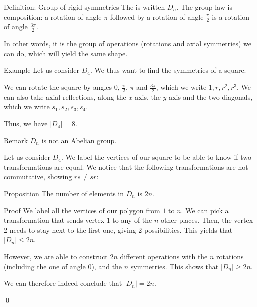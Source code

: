 \documentclass[a4paper]{article}
\begin{document}
\begin{parag}{Definition: Group of rigid symmetries}
    The  is written $D_n$. The group law is composition: a rotation of angle $\pi$ followed by a rotation of angle $\frac{\pi}{2}$ is a rotation of angle $\frac{3\pi}{2}$.

    In other words, it is the group of operations (rotations and axial symmetries) we can do, which will yield the same shape.
\end{parag}

\begin{parag}{Example}
    Let us consider $D_4$. We thus want to find the symmetries of a square.

    We can rotate the square by angles $0$, $\frac{\pi}{2}$, $\pi$ and $\frac{3\pi}{2}$, which we write $1, r, r^2, r^3$. We can also take axial reflections, along the $x$-axis, the $y$-axis and the two diagonals, which we write $s_1, s_2, s_3, s_4$.

    Thus, we have $\left|D_4\right| = 8$.
\end{parag}

\begin{parag}{Remark}
    $D_n$ is not an Abelian group.

    Let us consider $D_4$. We label the vertices of our square to be able to know if two transformations are equal. We notice that the following transformations are not commutative, showing $rs \neq sr$:
\end{parag}

\begin{parag}{Proposition}
    The number of elements in $D_n$ is $2n$.

    \begin{subparag}{Proof}
        We label all the vertices of our polygon from $1$ to $n$. We can pick a transformation that sends vertex $1$ to any of the $n$ other places. Then, the vertex 2 needs to stay next to the first one, giving 2 possibilities. This yields that $\left|D_n\right| \leq 2n$.

        However, we are able to construct $2n$ different operations with the $n$ rotations (including the one of angle 0), and the $n$ symmetries. This shows that $\left|D_n\right| \geq 2n$.

        We can therefore indeed conclude that $\left|D_n\right|= 2n$.

        \qed
    \end{subparag}
\end{parag}
\end{document}
